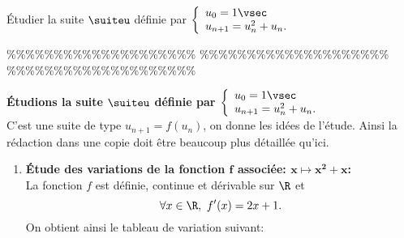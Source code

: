 


\begin{exercice}
\'Etudier la suite $\suiteu$ d\'efinie par 
$\left\lbrace\begin{array}{l}
u_0=1\vsec\\
u_{n+1}=u_n^2+u_n.
\end{array}\right.$
\end{exercice}


\%\%\%\%\%\%\%\%\%\%\%\%\%\%\%\%\%\%\%\%
\%\%\%\%\%\%\%\%\%\%\%\%\%\%\%\%\%\%\%\%
\%\%\%\%\%\%\%\%\%\%\%\%\%\%\%\%\%\%\%\%



\begin{correction}
\textbf{\'Etudions la suite $\mathbf{\suiteu}$ d\'efinie par $\mathbf{\left\lbrace\begin{array}{l}
u_0=1\vsec\\
u_{n+1}=u_n^2+u_n.
\end{array}\right.}$}\\
\noindent C'est une suite de type $u_{n+1}=f(u_n)$, on donne les id\'ees de l'\'etude. Ainsi la r\'edaction dans une copie doit \^{e}tre beaucoup plus d\'etaill\'ee qu'ici.
\begin{enumerate}
 \item \textbf{\'Etude des variations de la fonction $\mathbf{f}$ associ\'ee: $\mathbf{x\mapsto x^2+x}$:}\\
\noindent La fonction $f$ est d\'efinie, continue et d\'erivable sur $\R$ et 
$$\forall x\in\R,\ f^{\prime}(x)=2x+1.$$
On obtient ainsi le tableau de variation suivant:
\begin{center}
\end{center}

\end{enumerate}
\end{correction}
